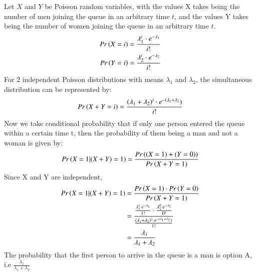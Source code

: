 	Let $X$ and $Y$ be Poisson random variables, with the values X takes being the number of men joining the queue in an arbitrary time $t$, and the values Y takes being the number of women joining the queue in an arbitrary time $t$.
\begin{align}
    Pr\left(X=i\right)&=\frac{\lambda_1^i\cdot e^{-\lambda_1}}{i!}\\
    Pr\left(Y=i\right)&=\frac{\lambda_2^i\cdot e^{-\lambda_2}}{i!}
\end{align}
For 2 independent Poisson distributions with means $\lambda_1$ and $\lambda_2$, the simultaneous distribution can be represented by:
\begin{align}
    Pr\left(X+Y=i\right)=\frac{(\lambda_1+\lambda_2)^i\cdot e^{-(\lambda_1+\lambda_2})}{i!}
\end{align}
Now we take conditional probability that if only one person entered the queue within a certain time t, then the probability of them being a man and not a woman is given by:
\begin{align}
    Pr\left(X=1|(X+Y)=1\right)&=\frac{Pr\left((X=1) + (Y=0)\right)}{Pr\left(X+Y=1\right)}\\
\end{align}
Since X and Y are independent, 
\begin{align}
    Pr\left(X=1|(X+Y)=1\right)&=\frac{Pr\left(X=1\right)\cdot Pr\left(Y=0\right)}{Pr\left(X+Y=1\right)}\\
    &=\frac{\frac{\lambda_1^1\cdot e^{-\lambda_1}}{1!}\cdot \frac{\lambda_2^0\cdot e^{-\lambda_2}}{0!}}{\frac{(\lambda_1+\lambda_2)^1\cdot e^{-(\lambda_1+\lambda_2})}{1!}}\\
    &=\frac{\lambda_1}{\lambda_1+\lambda_2}
\end{align}
 The probability that the first person to arrive in the queue is a man is option A, i.e $\frac{\lambda_1}{\lambda_1+\lambda_2}$
